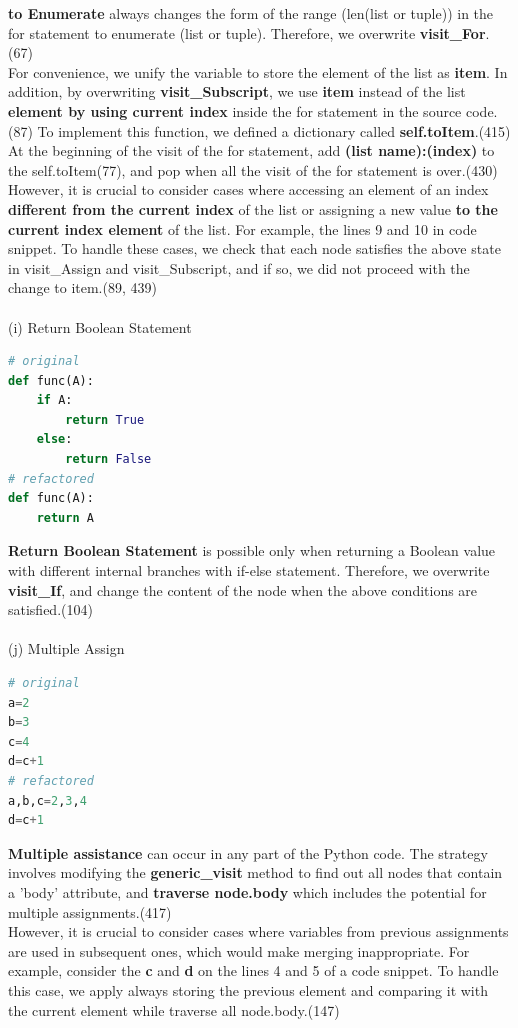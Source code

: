 \documentclass[11pt]{article}
\begin{document}
\textbf{to Enumerate} always changes the form of the range (len(list or tuple)) in the for statement to enumerate (list or tuple). Therefore, we overwrite \textbf{visit\_For}.(67)\\
For convenience, we unify the variable to store the element of the list as \textbf{item}. In addition, by overwriting \textbf{visit\_Subscript}, we use \textbf{item} instead of the list \textbf{element by using current index} inside the for statement in the source code.(87) To implement this function, we defined a dictionary called \textbf{self.toItem}.(415) At the beginning of the visit of the for statement, add \textbf{(list name):(index)} to the self.toItem(77), and pop when all the visit of the for statement is over.(430)\\
However, it is crucial to consider cases where accessing an element of an index \textbf{different from the current index} of the list or assigning a new value \textbf{to the current index element} of the list. For example, the lines 9 and 10 in code snippet. To handle these cases, we check that each node satisfies the above state in visit\_Assign and visit\_Subscript, and if so, we did not proceed with the change to item.(89, 439)\\ \\
(i) Return Boolean Statement
\begin{lstlisting}[language=python]
# original
def func(A):
    if A:
        return True
    else:
        return False
# refactored
def func(A):
    return A
\end{lstlisting}
\textbf{Return Boolean Statement} is possible only when returning a Boolean value with different internal branches with if-else statement. Therefore, we overwrite \textbf{visit\_If}, and change the content of the node when the above conditions are satisfied.(104)\\ \\
(j) Multiple Assign
\begin{lstlisting}[language=python]
# original
a=2
b=3
c=4
d=c+1
# refactored
a,b,c=2,3,4
d=c+1
\end{lstlisting}
\textbf{Multiple assistance} can occur in any part of the Python code. The strategy involves modifying the \textbf{generic\_visit} method to find out all nodes that contain a 'body' attribute, and \textbf{traverse node.body} which includes the potential for multiple assignments.(417)\\
However, it is crucial to consider cases where variables from previous assignments are used in subsequent ones, which would make merging inappropriate. For example, consider the \textbf{c} and \textbf{d} on the lines 4 and 5 of a code snippet. To handle this case, we apply always storing the previous element and comparing it with the current element while traverse all node.body.(147)\\
\end{document}
